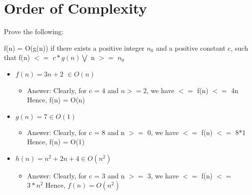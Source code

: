 \documentclass[11pt]{article}
\begin{document}
\section{Order of Complexity}

Prove the following:

f(n) = O(g(n)) if there exists a positive integer $n_0$ and a positive constant c, such that f(n) $<=$ $c*g(n) \bigvee$ n $>=$ $n_0$

\begin{itemize}

\item $f(n) = 3n + 2 $ $ \in O(n) $

\begin{itemize}

\item Answer: Clearly, for c = 4 and $n >= 2$, we have
 $<=$ f(n) $<=$ 4n
\newline Hence, f(n) = O(n)

\end{itemize} 

\end{itemize}


\begin{itemize}

\item $g(n) = 7  \in O(1) $

\begin{itemize}

\item Answer: Clearly, for c = 8 and n $>=$ 0, we have 
 $<=$ f(n) $<=$ 8*1
\newline Hence, f(n) = O(1)

\end{itemize} 


\end{itemize}


\begin{itemize}

\item $h(n) = n^{2} + 2n + 4 \in O(n^{2})$

\begin{itemize}

\item Answer: Clearly, for c = 3 and n $>=$ 3, we have
 $<=$ f(n) $<=$ $3*n^{2}$
\newline Hence, $f(n) = O(n^{2})$

\end{itemize} 

\end{itemize}
\end{document}
